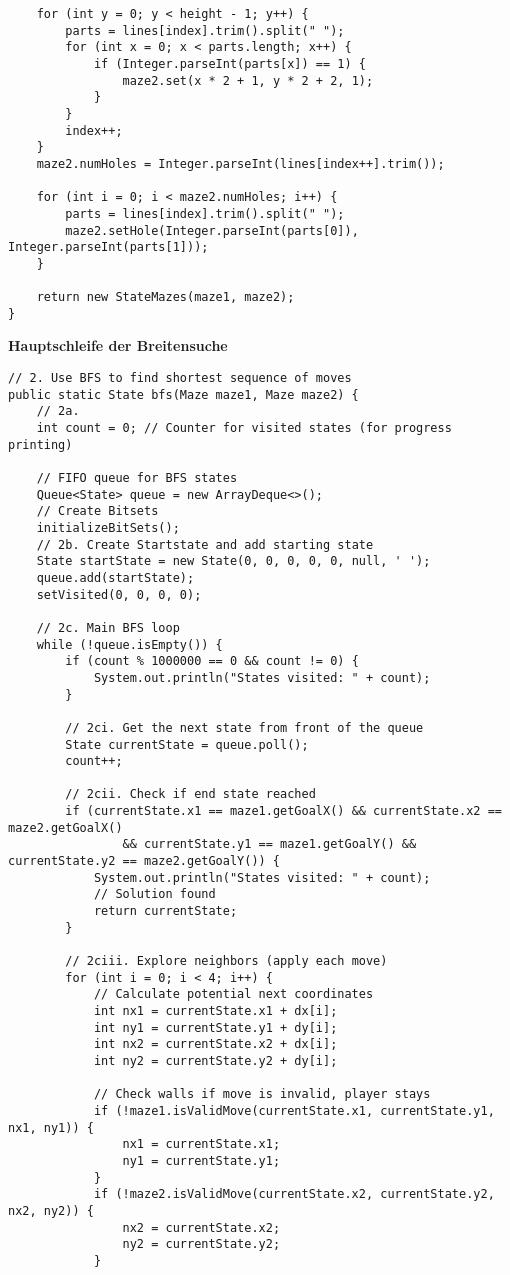 \documentclass[a4paper,10pt,ngerman]{scrartcl}
\begin{document}
\begin{lstlisting}
    for (int y = 0; y < height - 1; y++) {
        parts = lines[index].trim().split(" ");
        for (int x = 0; x < parts.length; x++) {
            if (Integer.parseInt(parts[x]) == 1) {
                maze2.set(x * 2 + 1, y * 2 + 2, 1);
            }
        }
        index++;
    }
    maze2.numHoles = Integer.parseInt(lines[index++].trim());

    for (int i = 0; i < maze2.numHoles; i++) {
        parts = lines[index].trim().split(" ");
        maze2.setHole(Integer.parseInt(parts[0]), Integer.parseInt(parts[1]));
    }

    return new StateMazes(maze1, maze2);
}
\end{lstlisting}

\textbf{Hauptschleife der Breitensuche}
\begin{lstlisting}
// 2. Use BFS to find shortest sequence of moves
public static State bfs(Maze maze1, Maze maze2) {
    // 2a.
    int count = 0; // Counter for visited states (for progress printing)

    // FIFO queue for BFS states
    Queue<State> queue = new ArrayDeque<>();
    // Create Bitsets
    initializeBitSets();
    // 2b. Create Startstate and add starting state
    State startState = new State(0, 0, 0, 0, 0, null, ' ');
    queue.add(startState);
    setVisited(0, 0, 0, 0);

    // 2c. Main BFS loop
    while (!queue.isEmpty()) {
        if (count % 1000000 == 0 && count != 0) {
            System.out.println("States visited: " + count);
        }

        // 2ci. Get the next state from front of the queue
        State currentState = queue.poll();
        count++;

        // 2cii. Check if end state reached
        if (currentState.x1 == maze1.getGoalX() && currentState.x2 == maze2.getGoalX()
                && currentState.y1 == maze1.getGoalY() && currentState.y2 == maze2.getGoalY()) {
            System.out.println("States visited: " + count);
            // Solution found
            return currentState;
        }

        // 2ciii. Explore neighbors (apply each move)
        for (int i = 0; i < 4; i++) {
            // Calculate potential next coordinates
            int nx1 = currentState.x1 + dx[i];
            int ny1 = currentState.y1 + dy[i];
            int nx2 = currentState.x2 + dx[i];
            int ny2 = currentState.y2 + dy[i];

            // Check walls if move is invalid, player stays
            if (!maze1.isValidMove(currentState.x1, currentState.y1, nx1, ny1)) {
                nx1 = currentState.x1;
                ny1 = currentState.y1;
            }
            if (!maze2.isValidMove(currentState.x2, currentState.y2, nx2, ny2)) {
                nx2 = currentState.x2;
                ny2 = currentState.y2;
            }


\end{lstlisting}
\end{document}
